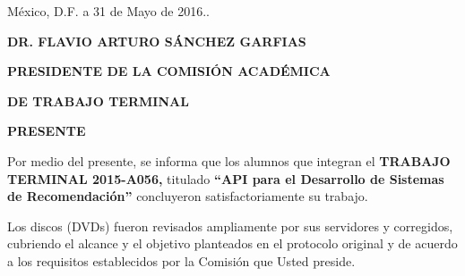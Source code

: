 \begin{titlepage}
    \vspace{0.5cm}
   
    \large \raggedleft México, D.F. a 31 de Mayo de 2016.. \linebreak
    
    \vspace{0.5cm}
    \raggedright \small \textbf{DR. FLAVIO ARTURO SÁNCHEZ GARFIAS } \linebreak
    \raggedright \small \textbf{PRESIDENTE DE LA COMISIÓN ACADÉMICA } \linebreak
    \raggedright \small \textbf{DE TRABAJO TERMINAL  } \linebreak
    \raggedright \small \textbf{PRESENTE } \linebreak
    
    \vspace{0.5cm}



    Por medio del presente, se informa que los alumnos que integran el \textbf{TRABAJO TERMINAL 2015-A056,} titulado  \textbf{``API para el Desarrollo de Sistemas de Recomendaci\'on''} concluyeron satisfactoriamente su trabajo.\linebreak

    
    Los discos (DVDs) fueron revisados ampliamente por sus servidores y corregidos, 
    cubriendo el alcance y el objetivo planteados en el protocolo original y de acuerdo a los requisitos establecidos por la Comisión que Usted preside. 

    \vspace{0.8cm}
     

\end{titlepage}
